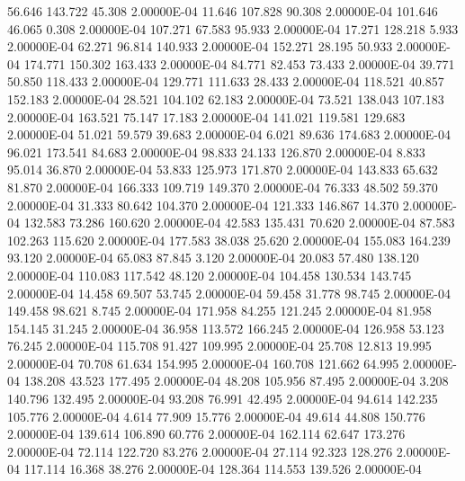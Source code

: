     56.646   143.722    45.308  2.00000E-04
    11.646   107.828    90.308  2.00000E-04
   101.646    46.065     0.308  2.00000E-04
   107.271    67.583    95.933  2.00000E-04
    17.271   128.218     5.933  2.00000E-04
    62.271    96.814   140.933  2.00000E-04
   152.271    28.195    50.933  2.00000E-04
   174.771   150.302   163.433  2.00000E-04
    84.771    82.453    73.433  2.00000E-04
    39.771    50.850   118.433  2.00000E-04
   129.771   111.633    28.433  2.00000E-04
   118.521    40.857   152.183  2.00000E-04
    28.521   104.102    62.183  2.00000E-04
    73.521   138.043   107.183  2.00000E-04
   163.521    75.147    17.183  2.00000E-04
   141.021   119.581   129.683  2.00000E-04
    51.021    59.579    39.683  2.00000E-04
     6.021    89.636   174.683  2.00000E-04
    96.021   173.541    84.683  2.00000E-04
    98.833    24.133   126.870  2.00000E-04
     8.833    95.014    36.870  2.00000E-04
    53.833   125.973   171.870  2.00000E-04
   143.833    65.632    81.870  2.00000E-04
   166.333   109.719   149.370  2.00000E-04
    76.333    48.502    59.370  2.00000E-04
    31.333    80.642   104.370  2.00000E-04
   121.333   146.867    14.370  2.00000E-04
   132.583    73.286   160.620  2.00000E-04
    42.583   135.431    70.620  2.00000E-04
    87.583   102.263   115.620  2.00000E-04
   177.583    38.038    25.620  2.00000E-04
   155.083   164.239    93.120  2.00000E-04
    65.083    87.845     3.120  2.00000E-04
    20.083    57.480   138.120  2.00000E-04
   110.083   117.542    48.120  2.00000E-04
   104.458   130.534   143.745  2.00000E-04
    14.458    69.507    53.745  2.00000E-04
    59.458    31.778    98.745  2.00000E-04
   149.458    98.621     8.745  2.00000E-04
   171.958    84.255   121.245  2.00000E-04
    81.958   154.145    31.245  2.00000E-04
    36.958   113.572   166.245  2.00000E-04
   126.958    53.123    76.245  2.00000E-04
   115.708    91.427   109.995  2.00000E-04
    25.708    12.813    19.995  2.00000E-04
    70.708    61.634   154.995  2.00000E-04
   160.708   121.662    64.995  2.00000E-04
   138.208    43.523   177.495  2.00000E-04
    48.208   105.956    87.495  2.00000E-04
     3.208   140.796   132.495  2.00000E-04
    93.208    76.991    42.495  2.00000E-04
    94.614   142.235   105.776  2.00000E-04
     4.614    77.909    15.776  2.00000E-04
    49.614    44.808   150.776  2.00000E-04
   139.614   106.890    60.776  2.00000E-04
   162.114    62.647   173.276  2.00000E-04
    72.114   122.720    83.276  2.00000E-04
    27.114    92.323   128.276  2.00000E-04
   117.114    16.368    38.276  2.00000E-04
   128.364   114.553   139.526  2.00000E-04

